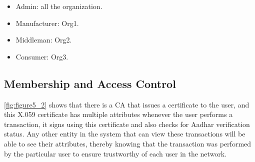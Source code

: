 \begin{itemize}
  \item Admin: all the organization.
  \item Manufacturer: Org1.
  \item Middleman: Org2.
  \item Consumer: Org3.
\end{itemize}
    

\subsection{Membership and Access Control}

\noindent \ref{fig:figure5_2} shows that there is a CA that issues a certificate to the user, and this X.059 certificate has multiple attributes whenever 
the user performs a transaction, it signs using this certificate and also checks for Aadhar verification status. Any other entity 
in the system that can view these transactions will be able to see their attributes, thereby knowing that the transaction was 
performed by the particular user to ensure trustworthy of each user in the network.

